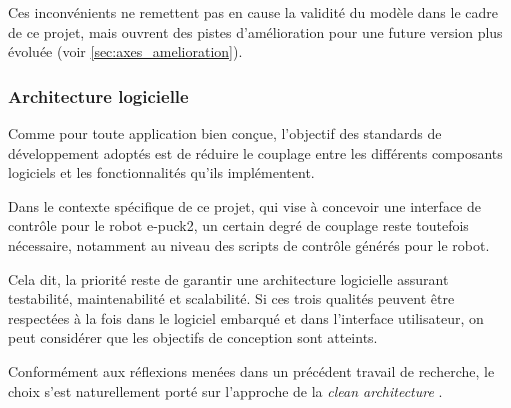 Ces inconvénients ne remettent pas en cause la validité du modèle dans le cadre de ce projet, mais ouvrent des pistes d’amélioration pour une future version plus évoluée (voir \autoref{sec:axes_amelioration}).

\subsubsection{Architecture logicielle} \label{sec:architecture_logicielle}
Comme pour toute application bien conçue, l’objectif des standards de développement adoptés est de réduire le couplage entre les différents composants logiciels et les fonctionnalités qu’ils implémentent.

Dans le contexte spécifique de ce projet, qui vise à concevoir une interface de contrôle pour le robot e-puck2, un certain degré de couplage reste toutefois nécessaire, notamment au niveau des scripts de contrôle générés pour le robot.

Cela dit, la priorité reste de garantir une architecture logicielle assurant testabilité, maintenabilité et scalabilité. Si ces trois qualités peuvent être respectées à la fois dans le logiciel embarqué et dans l'interface utilisateur, on peut considérer que les objectifs de conception sont atteints.

Conformément aux réflexions menées dans un précédent travail de recherche, le choix s’est naturellement porté sur l’approche de la \textit{clean architecture} \autocite{tinael_devresse_analyse_2023}.
